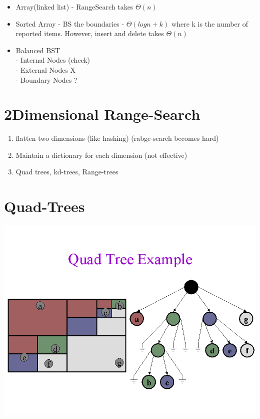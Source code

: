 \documentclass[12pt]{article}
\begin{document}
	\begin{itemize}
		\item Array(linked list) - RangeSearch takes $\Theta(n)$
		\item Sorted Array - BS the boundaries - $\Theta(logn + k)$ where k is the number of reported items. However, insert and delete takes $\Theta(n)$
		\item Balanced BST\\
		- Internal Nodes (check)\\
		- External Nodes X\\
		- Boundary Nodes ?\\
	\end{itemize}
	
	\section*{2Dimensional Range-Search}
	\begin{enumerate}
		\item flatten two dimensions (like hashing) (rabge-search becomes hard)
		\item Maintain a dictionary for each dimension (not effective)
		\item Quad trees, kd-trees, Range-trees
	\end{enumerate}
	
	\section*{Quad-Trees}
	
	\includegraphics[scale=0.5]{quad-tree.png}\\
	
\end{document}
